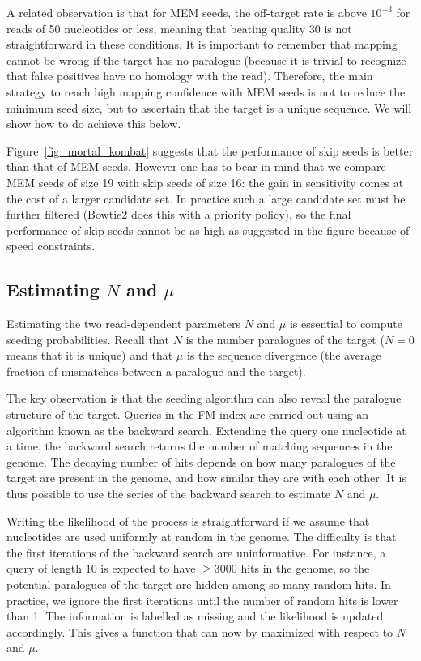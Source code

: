 \documentclass[a4,center,fleqn]{NAR}
\begin{document}
A related observation is that for MEM seeds, the off-target rate is above
$10^{-3}$ for reads of 50 nucleotides or less, meaning that beating
quality 30 is not straightforward in these conditions. It is important to
remember that mapping cannot be wrong if the target has no paralogue
(because it is trivial to recognize that false positives have no homology
with the read). Therefore, the main strategy to reach high mapping
confidence with MEM seeds is not to reduce the minimum seed size, but to
ascertain that the target is a unique sequence. We will show how to do
achieve this below.

Figure~\ref{fig_mortal_kombat} suggests that the performance of skip seeds
is better than that of MEM seeds. However one has to bear in mind that we
compare MEM seeds of size 19 with skip seeds of size 16: the gain in
sensitivity comes at the cost of a larger candidate set. In practice such
a large candidate set must be further filtered (Bowtie2 does this with a
priority policy), so the final performance of skip seeds cannot be as high
as suggested in the figure because of speed constraints.


\subsection{Estimating $N$ and $\mu$}
\label{ref_Nmu}

Estimating the two read-dependent parameters $N$ and $\mu$ is essential to
compute seeding probabilities. Recall that $N$ is the number paralogues of
the target ($N=0$ means that it is unique) and that $\mu$ is the sequence
divergence (the average fraction of mismatches between a paralogue and the
target).

The key observation is that the seeding algorithm can also reveal the
paralogue structure of the target. Queries in the FM index are carried out
using an algorithm known as the backward search. Extending the query one
nucleotide at a time, the backward search returns the number of matching
sequences in the genome. The decaying number of hits depends on how many
paralogues of the target are present in the genome, and how similar they
are with each other. It is thus possible to use the series of the backward
search to estimate $N$ and $\mu$.

Writing the likelihood of the process is straightforward if we assume that
nucleotides are used uniformly at random in the genome. The difficulty is
that the first iterations of the backward search are uninformative. For
instance, a query of length 10 is expected to have $\geq 3000$ hits in
the genome, so the potential paralogues of the target are hidden among so
many random hits. In practice, we ignore the first iterations until the
number of random hits is lower than 1. The information is labelled as
missing and the likelihood is updated accordingly. This gives a function
that can now by maximized with respect to $N$ and $\mu$.
\end{document}
